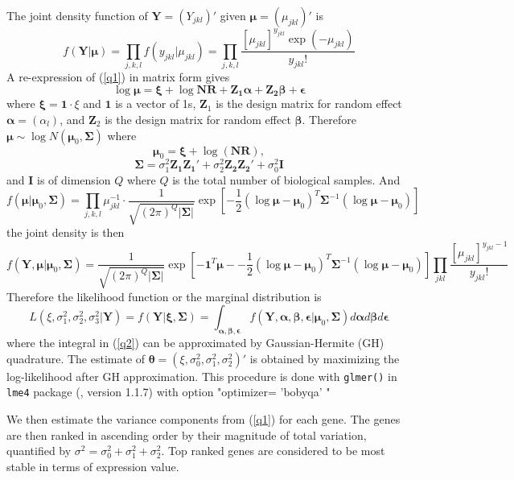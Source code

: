 \documentclass[11pt, a4paper]{article}
\begin{document}
The joint density function of $\bm Y=(Y_{jkl})'$ given $\bm \mu= (\mu_{jkl})'$ is 
  \[f(\bm Y|\bm \mu )=\prod_{ j, k,l}f(y_{jkl}|\mu_{jkl})=\prod_{j,k,l}\frac{[\mu_{jkl}]^{y_{jkl}}\exp(-\mu_{jkl})}{y_{jkl}!}\]
A re-expression of  (\ref{q1}) in matrix form gives 
\[\log\bm \mu= \bm \xi + \log{\bm{NR}} + \bm {Z_1\alpha} + \bm{Z_2\beta} + \bm \epsilon \]
where $\bm \xi = \bm 1\cdot\xi$ and $\bm 1$ is a vector of 1s, $\bm Z_1$ is the design matrix for random effect $\bm \alpha=(\alpha_l)$, and $\bm Z_2$ is the design matrix for random effect $\bm \beta $. 
Therefore  $\bm\mu  \sim \log N(\bm \mu_0, \bm \Sigma)$ where 
$$\bm \mu_0 =\bm\xi + \log(\bm {NR}),$$ 
$$\bm \Sigma = \sigma_1^2\bm {Z_1Z_1'} + \sigma_2^2\bm {Z_2 Z_2'} +\sigma_0^2 \bm I$$
and $\bm I$ is of dimension $Q$ where $Q$ is the total number of biological samples. 
 And 
 \[f(\bm \mu |\bm \mu_0, \bm \Sigma)=\prod_{j,k,l} \mu_{jkl}^{-1}\cdot \frac{1}{ \sqrt{(2\pi)^Q|\bm\Sigma|}}\exp[-\frac{1}{2} {(\log\bm \mu - \bm \mu_0)^T\bm \Sigma^{-1}(\log\bm \mu - \bm \mu_0)}]\]
 the joint density is then
  \[f(\bm Y, \bm \mu |\bm \mu_0, \bm \Sigma) =\frac{1}{\sqrt{(2\pi)^Q|\bm \Sigma|}}\exp[-\bm 1^T\bm \mu - -\frac{1}{2} {(\log\bm \mu - \bm \mu_0)^T\bm \Sigma^{-1}(\log\bm \mu - \bm \mu_0)}]\prod_{jkl}\frac{[\mu_{jkl}]^{y_{jkl}-1}}{y_{jkl}!}\]
   Therefore the likelihood function or the marginal distribution is 
   \begin{equation}\label{q2}
   L(\xi, \sigma_1^2, \sigma_2^2, \sigma_3^2|\bm Y)=f(\bm Y|\bm \xi, \bm \Sigma)= \int_{\bm{\alpha,\beta,\epsilon}} f(\bm Y, \bm \alpha, \bm \beta, \bm \epsilon |\bm \mu_0, \bm \Sigma)d\bm \alpha d \bm\beta d\bm \epsilon 
   \end{equation}
where the integral in (\ref{q2}) can be approximated by Gaussian-Hermite (GH) quadrature. The estimate of $\bm\theta = (\xi, \sigma_0^2, \sigma_1^2, \sigma_2^2)'$ is obtained by maximizing the log-likelihood after GH approximation.  This procedure is done with \verb"glmer()"  in \verb"lme4"  package (\cite{bates2012lme4}, version 1.1.7)  with option  "optimizer= 'bobyqa' " 
 

 We then estimate the variance components from (\ref{q1}) for each gene.  The genes are then ranked  in ascending order by their magnitude of total variation, quantified by $\sigma^2 = \sigma^2_0 + \sigma_1^2 + \sigma_2^2$. Top ranked genes are considered to be most stable in terms of expression value. 
  
\end{document}
